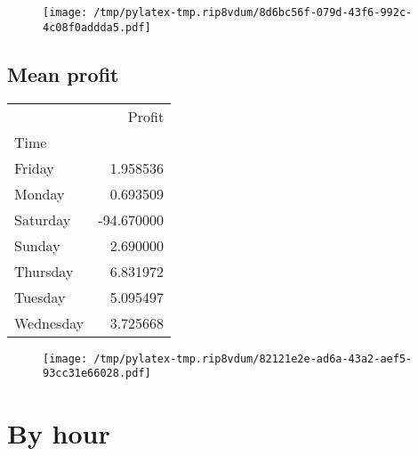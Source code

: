 \documentclass{article}%
\begin{document}
\begin{figure}[htbp]%
\centering%
\texttt{[image: /tmp/pylatex-tmp.rip8vdum/8d6bc56f-079d-43f6-992c-4c08f0addda5.pdf]}%
\end{figure}

%
\newpage %
\subsection{Mean profit }%
\label{subsec:Meanprofit}%
\begin{tabular}{lr}
\toprule
{} &     Profit \\
Time      &            \\
\midrule
Friday    &   1.958536 \\
Monday    &   0.693509 \\
Saturday  & -94.670000 \\
Sunday    &   2.690000 \\
Thursday  &   6.831972 \\
Tuesday   &   5.095497 \\
Wednesday &   3.725668 \\
\bottomrule
\end{tabular}
%


\begin{figure}[htbp]%
\centering%
\texttt{[image: /tmp/pylatex-tmp.rip8vdum/82121e2e-ad6a-43a2-aef5-93cc31e66028.pdf]}%
\end{figure}

%
\newpage %
\section{By hour}%
\label{sec:Byhour}%
\end{document}
